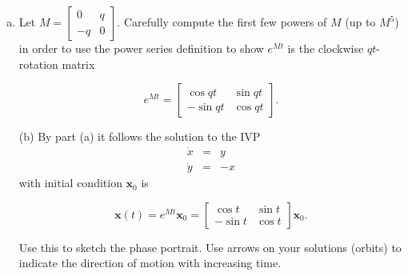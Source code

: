 \documentclass[11pt,letterpaper,boxed]{pset}
\begin{document}
    \begin{problem} [Exercise 2.]
        \begin{enumerate} [(a)]
            \item Let $ M = \begin{bmatrix} 0 & q \\ -q & 0  \end{bmatrix}.$ 
            Carefully compute the first few powers of $M$ (up to $M^5$) in order to use the power series definition  to show $e^{Mt}$ is the clockwise $qt$-rotation matrix
            
            \[ e^{Mt} =  \begin{bmatrix} \cos qt & \sin qt \\ - \sin qt & \cos qt \end{bmatrix}. \]
            
            \item[(b)] By part (a)  it follows the solution to the IVP
                \begin{eqnarray}
                \dot{x} &= &  y  \\
                \dot{y} & = & - x
                \end{eqnarray}
            with initial condition $\mathbf{x}_0$ is 
            
            \[  \mathbf{x}(t) = e^{Mt} \mathbf{x}_0 = \begin{bmatrix} \cos t & \sin t \\ - \sin t & \cos t \end{bmatrix}\mathbf{x}_0.  \]
            
            Use this to sketch the phase portrait. Use arrows on your solutions (orbits) to indicate the direction of motion with increasing time. 
        \end{enumerate}
    \end{problem}
    \newpage
    
\end{document}

